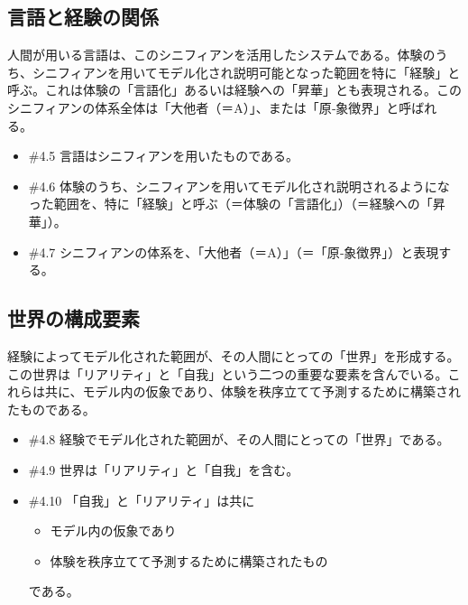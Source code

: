 \subsection{言語と経験の関係}\label{ux8a00ux8a9eux3068ux7d4cux9a13ux306eux95a2ux4fc2}

人間が用いる言語は、このシニフィアンを活用したシステムである。体験のうち、シニフィアンを用いてモデル化され説明可能となった範囲を特に「経験」と呼ぶ。これは体験の「言語化」あるいは経験への「昇華」とも表現される。このシニフィアンの体系全体は「大他者（＝A）」、または「原‐象徴界」と呼ばれる。

\begin{note}{}
  \begin{itemize}
    \tightlist
    \item{\#4.5}
      言語はシニフィアンを用いたものである。
    \item{\#4.6}
      体験のうち、シニフィアンを用いてモデル化され説明されるようになった範囲を、特に「経験」と呼ぶ（＝体験の「言語化」）（＝経験への「昇華」）。
    \item{\#4.7}
      シニフィアンの体系を、「大他者（＝A）」（＝「原‐象徴界」）と表現する。
  \end{itemize}
\end{note}

\subsection{世界の構成要素}\label{ux4e16ux754cux306eux69cbux6210ux8981ux7d20}

経験によってモデル化された範囲が、その人間にとっての「世界」を形成する。この世界は「リアリティ」と「自我」という二つの重要な要素を含んでいる。これらは共に、モデル内の仮象であり、体験を秩序立てて予測するために構築されたものである。

\begin{note}{}
  \begin{itemize}
    \tightlist
    \item{\#4.8}
      経験でモデル化された範囲が、その人間にとっての「世界」である。
    \item{\#4.9}
      世界は「リアリティ」と「自我」を含む。
    \item{\#4.10}
      「自我」と「リアリティ」は共に
      \begin{itemize}
        \tightlist
        \item
          モデル内の仮象であり
        \item
          体験を秩序立てて予測するために構築されたもの
      \end{itemize}
      である。
  \end{itemize}
\end{note}

